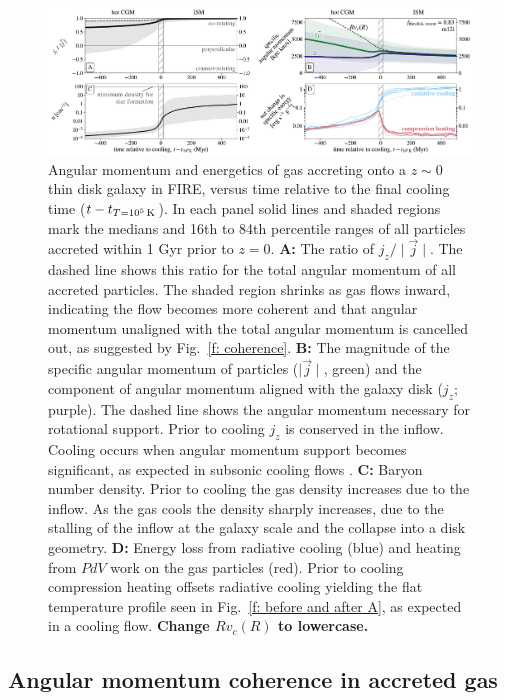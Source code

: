 \documentclass[fleqn,usenatbib]{mnras}
\newcommand{\tcon}{t_{T=10^5\,{\rm K}}}
\begin{document}
\begin{figure}
\includegraphics[width=\textwidth]{figures/before_and_after/before_and_after_m12i_md.pdf}
\caption{
Angular momentum and energetics of gas accreting onto a $z\sim0$ thin disk galaxy in FIRE, versus time relative to the final cooling time ($t - \tcon$).
In each panel solid lines and shaded regions mark the medians and 16th to 84th percentile ranges of all particles accreted within 1 Gyr prior to $z=0$.
\textbf{A:}
The ratio of $j_z / \mid \vec j \mid$.
The dashed line shows this ratio for the total angular momentum of all accreted particles.
The shaded region shrinks as gas flows inward, indicating the flow becomes more coherent and that angular momentum unaligned with the total angular momentum is cancelled out, as suggested by Fig.~\ref{f: coherence}. 
\textbf{B:}
The magnitude of the specific angular momentum of particles ($\mid\vec{j}\mid$, green) and the component of angular momentum aligned with the galaxy disk ($j_z$; purple).
The dashed line shows the angular momentum necessary for rotational support.
Prior to cooling $j_z$ is conserved in the inflow.
Cooling occurs when angular momentum support becomes significant, as expected in subsonic cooling flows \citep{Cowie1980, Stern2019}.
\textbf{C:}
Baryon number density.
Prior to cooling the gas density increases due to the inflow.
As the gas cools the density sharply increases, due to the stalling of the inflow at the galaxy scale and the collapse into a disk geometry. 
\textbf{D:}
Energy loss from radiative cooling (blue) and heating from $PdV$ work on the gas particles (red).
Prior to cooling compression heating offsets radiative cooling yielding the flat temperature profile seen in Fig.~\ref{f: before and after A}, as expected in a cooling flow. 
\textbf{Change $Rv_c(R)$ to lowercase.}
}
\label{f: before and after B}
\end{figure}




\subsection{Angular momentum coherence in accreted gas}
\label{s: mechanics -- coherence}
\end{document}
